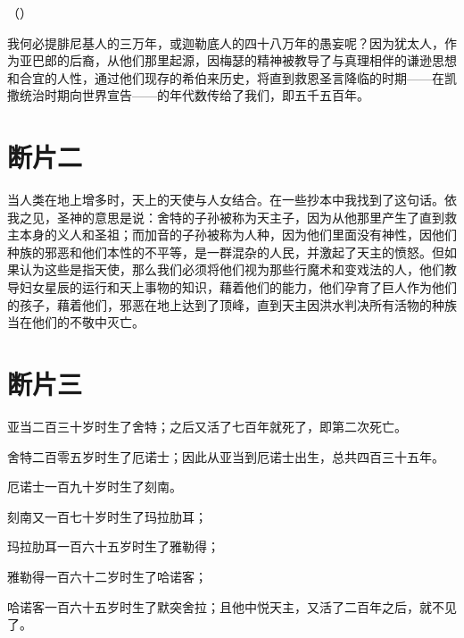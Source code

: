 （）\par

我何必提腓尼基人的三万年，或迦勒底人的四十八万年的愚妄呢？因为犹太人，作为亚巴郎的后裔，从他们那里起源，因梅瑟的精神被教导了与真理相伴的谦逊思想和合宜的人性，通过他们现存的希伯来历史，将直到救恩圣言降临的时期——在凯撒统治时期向世界宣告——的年代数传给了我们，即五千五百年。\par


\section{断片二}

当人类在地上增多时，天上的天使与人女结合。在一些抄本中我找到了这句话。依我之见，圣神的意思是说：舍特的子孙被称为天主子，因为从他那里产生了直到救主本身的义人和圣祖；而加音的子孙被称为人种，因为他们里面没有神性，因他们种族的邪恶和他们本性的不平等，是一群混杂的人民，并激起了天主的愤怒。但如果认为这些是指天使，那么我们必须将他们视为那些行魔术和变戏法的人，他们教导妇女星辰的运行和天上事物的知识，藉着他们的能力，他们孕育了巨人作为他们的孩子，藉着他们，邪恶在地上达到了顶峰，直到天主因洪水判决所有活物的种族当在他们的不敬中灭亡。\par


\section{断片三}

亚当二百三十岁时生了舍特；之后又活了七百年就死了，即第二次死亡。\par

舍特二百零五岁时生了厄诺士；因此从亚当到厄诺士出生，总共四百三十五年。\par

厄诺士一百九十岁时生了刻南。\par

刻南又一百七十岁时生了玛拉肋耳；\par

玛拉肋耳一百六十五岁时生了雅勒得；\par

雅勒得一百六十二岁时生了哈诺客；\par

哈诺客一百六十五岁时生了默突舍拉；且他中悦天主，又活了二百年之后，就不见了。\par

